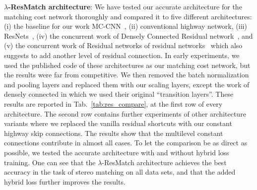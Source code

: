 \documentclass[10pt, twocolumn, letterpaper]{article}
\begin{document}
\textbf{$\lambda$-ResMatch architecture}:
We have tested our accurate architecture for the matching cost network thoroughly and compared it to five different architectures: (i) the baseline for our work MC-CNN~\cite{newlecun}, (ii) conventional highway network, (iii)  ResNets~\cite{residual}, (iv) the concurrent work of Densely Connected Residual network~\cite{dense}, and (v) the concurrent work of Residual networks of residual networks~\cite{resinres} which also suggests to add another level of residual connection. In early experiments, we used the published code of these architectures as our matching cost network, but the results were far from competitive. We then removed the batch normalization and pooling layers and replaced them with our scaling layers, except the work of densely connected in which we used their original ``transition layers''. These results are reported in Tab.~\ref{tab:res_compare}, at the first row of every architecture. The second row contains further experiments of other architecture variants where we replaced the vanilla residual shortcuts with our constant highway skip connections. The results show that the multilevel constant connections contribute in almost all cases.
To let the comparison be as direct as possible, we tested the accurate architecture with and without hybrid loss training. One can see that the $\lambda$-ResMatch architecture achieves the best accuracy in the task of stereo matching on all data sets, and that the added hybrid loss further improves the results.
\end{document}
